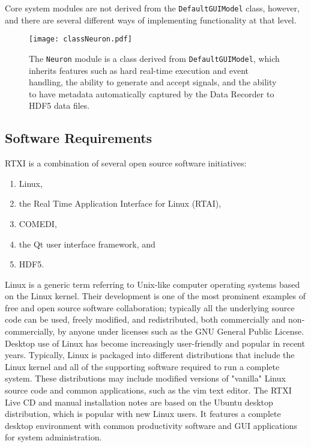 Core system modules are not derived from the \texttt{DefaultGUIModel} class, however, and there are several different ways of implementing functionality at that level.

\begin{figure} 
\begin{maxipage}
\begin{center}
\texttt{[image: classNeuron.pdf]} 
\caption[DefaultGUIModel-derived module]{The \texttt{Neuron} module is a class derived from \texttt{DefaultGUIModel}, which inherits features such as hard real-time execution and event handling, the ability to generate and accept signals, and the ability to have metadata automatically captured by the Data Recorder to HDF5 data files.} 
\end{center}
\end{maxipage}
\end{figure}

\subsection{Software Requirements}

RTXI is a combination of several open source software initiatives:

\begin{enumerate}

\item
Linux,

\item
the Real Time Application Interface for Linux (RTAI),

\item
COMEDI,

\item
the Qt user interface framework, and

\item
HDF5.

\end{enumerate}

Linux is a generic term referring to Unix-like computer operating systems based on the Linux kernel. Their development is one of the most prominent examples of free and open source software collaboration; typically all the underlying source code can be used, freely modified, and redistributed, both commercially and non-commercially, by anyone under licenses such as the GNU General Public License. Desktop use of Linux has become increasingly user-friendly and popular in recent years. Typically, Linux is packaged into different distributions that include the Linux kernel and all of the supporting software required to run a complete system. These distributions may include modified versions of "vanilla" Linux source code and common applications, such as the vim text editor. The RTXI Live CD and manual installation notes are based on the Ubuntu desktop distribution, which is popular with new Linux users. It features a complete desktop environment with common productivity software and GUI applications for system administration.

